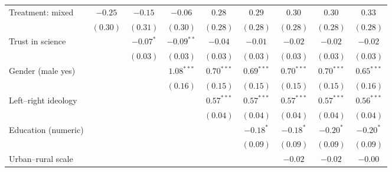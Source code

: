 \begin{table}[h]
\begin{center}
\begin{tabular}{l c c c c c c c c}
Treatment: mixed                                                                & $-0.25$      & $-0.15$      & $-0.06$      & $0.28$        & $0.29$        & $0.30$        & $0.30$        & $0.33$        \\
                                                                                & $(0.30)$     & $(0.31)$     & $(0.30)$     & $(0.28)$      & $(0.28)$      & $(0.28)$      & $(0.28)$      & $(0.28)$      \\
Trust in science                                                                &              & $-0.07^{*}$  & $-0.09^{**}$ & $-0.04$       & $-0.01$       & $-0.02$       & $-0.02$       & $-0.02$       \\
                                                                                &              & $(0.03)$     & $(0.03)$     & $(0.03)$      & $(0.03)$      & $(0.03)$      & $(0.03)$      & $(0.03)$      \\
Gender (male yes)                                                               &              &              & $1.08^{***}$ & $0.70^{***}$  & $0.69^{***}$  & $0.70^{***}$  & $0.70^{***}$  & $0.65^{***}$  \\
                                                                                &              &              & $(0.16)$     & $(0.15)$      & $(0.15)$      & $(0.15)$      & $(0.15)$      & $(0.16)$      \\
Left–right ideology                                                             &              &              &              & $0.57^{***}$  & $0.57^{***}$  & $0.57^{***}$  & $0.57^{***}$  & $0.56^{***}$  \\
                                                                                &              &              &              & $(0.04)$      & $(0.04)$      & $(0.04)$      & $(0.04)$      & $(0.04)$      \\
Education (numeric)                                                             &              &              &              &               & $-0.18^{*}$   & $-0.18^{*}$   & $-0.20^{*}$   & $-0.20^{*}$   \\
                                                                                &              &              &              &               & $(0.09)$      & $(0.09)$      & $(0.09)$      & $(0.09)$      \\
Urban–rural scale                                                               &              &              &              &               &               & $-0.02$       & $-0.02$       & $-0.00$       \\

\end{tabular}
\end{center}
\end{table}
